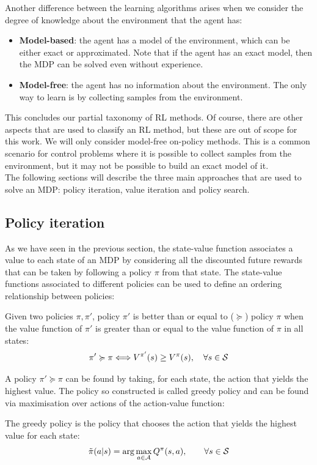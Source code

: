 Another difference between the learning algorithms arises when we consider the degree of knowledge about the environment that the agent has:
\begin{itemize}
\item \textbf{Model-based}: the agent has a model of the environment, which can be either exact or approximated. Note that if the agent has an exact model, then the MDP can be solved even without experience.
\item \textbf{Model-free}: the agent has no information about the environment. The only way to learn is by collecting samples from the environment.
\end{itemize}

This concludes our partial taxonomy of RL methods. Of course, there are other aspects that are used to classify an RL method, but these are out of scope for this work. We will only consider model-free on-policy methods. This is a common scenario for  control problems where it is possible to collect samples from the environment, but it may not be possible to build an exact model of it.\\
The following sections will describe the three main approaches that are used to solve an MDP: policy iteration, value iteration and policy search.

\subsection{Policy iteration}
As we have seen in the previous section, the state-value function associates a value to each state of an MDP by considering all the discounted future rewards that can be taken by following a policy $\pi$ from that state. The state-value functions associated to different policies can be used to define an ordering relationship between policies:

\begin{definition}
Given two policies $\pi, \pi'$, policy $\pi'$ is better than or equal to ($\succcurlyeq$) policy $\pi$ when the value function of $\pi'$ is greater than or equal to the value function of $\pi$ in all states:
\[
\pi' \succcurlyeq \pi \Longleftrightarrow V^{\pi'}(s) \geq V^{\pi}(s),\quad \forall s \in \mathcal{S}
\]
\end{definition}

A policy $\pi'\succcurlyeq\pi$ can be found by taking, for each state, the action that yields the highest value. The policy so constructed is called greedy policy and can be found via maximisation over actions of the action-value function:
\begin{definition}
The greedy policy is the policy that chooses the action that yields the highest value for each state:
\[
\tilde{\pi}(a|s) = \arg\max_{a\in\mathcal{A}} Q^{\pi}(s,a), \qquad \forall s \in \mathcal{S}
\]
\end{definition}

